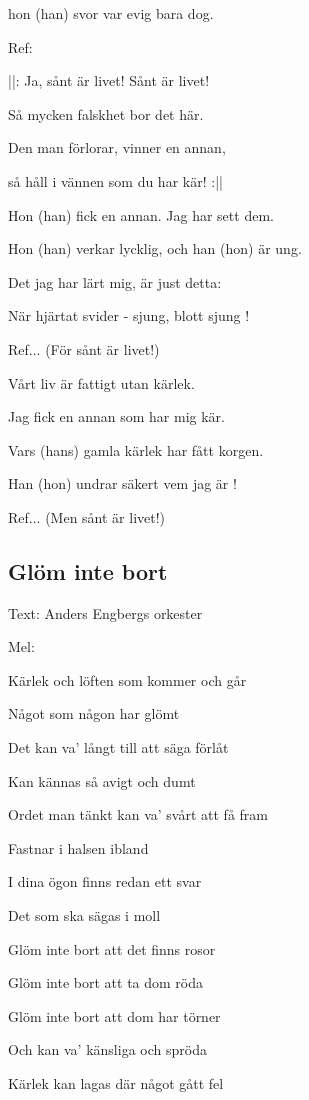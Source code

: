 hon (han) svor var evig bara dog.\bigskip

Ref:

||: Ja, sånt är livet! Sånt är livet!

Så mycken falskhet bor det här.

Den man förlorar, vinner en annan,

så håll i vännen som du har kär! :||\bigskip

Hon (han) fick en annan. Jag har sett dem.

Hon (han) verkar lycklig, och han (hon) är ung.

Det jag har lärt mig, är just detta:

När hjärtat svider - sjung, blott sjung !\bigskip

Ref... (För sånt är livet!)\bigskip

Vårt liv är fattigt utan kärlek.

Jag fick en annan som har mig kär.

Vars (hans) gamla kärlek har fått korgen.

Han (hon) undrar säkert vem jag är !\bigskip

Ref... (Men sånt är livet!)\bigskip

\subsection{\textbf{Glöm inte bort}}

Text:  Anders Engbergs orkester 

Mel: \bigskip

Kärlek och löften som kommer och går

Något som någon har glömt

Det kan va’ långt till att säga förlåt

Kan kännas så avigt och dumt\bigskip

Ordet man tänkt kan va’ svårt att få fram

Fastnar i halsen ibland

I dina ögon finns redan ett svar

Det som ska sägas i moll\bigskip

Glöm inte bort att det finns rosor

Glöm inte bort att ta dom röda

Glöm inte bort att dom har törner

Och kan va’ känsliga och spröda\bigskip

Kärlek kan lagas där något gått fel

